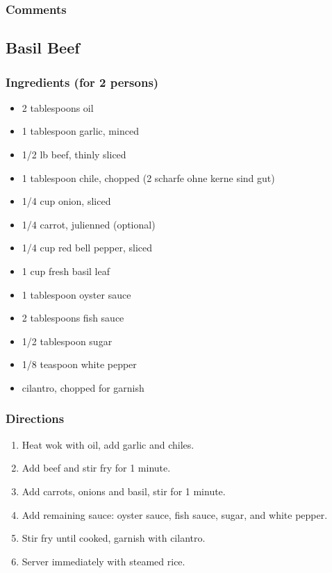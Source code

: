 \subsubsection*{Comments}

\subsection{Basil Beef}
\subsubsection*{Ingredients (for 2 persons)}
\begin{itemize}
\item[] 2 tablespoons oil
\item[] 1 tablespoon garlic, minced
\item[] 1/2 lb beef, thinly sliced
\item[] 1 tablespoon chile, chopped (2 scharfe ohne kerne sind gut)
\item[] 1/4 cup onion, sliced
\item[] 1/4 carrot, julienned (optional)
\item[] 1/4 cup red bell pepper, sliced
\item[] 1 cup fresh basil leaf
\item[] 1 tablespoon oyster sauce
\item[] 2 tablespoons fish sauce
\item[] 1/2 tablespoon sugar
\item[] 1/8 teaspoon white pepper
\item[] cilantro, chopped for garnish
\end{itemize}
\subsubsection*{Directions}
\begin{enumerate}
\item Heat wok with oil, add garlic and chiles.
\item Add beef and stir fry for 1 minute.
\item Add carrots, onions and basil, stir for 1 minute.
\item Add remaining sauce: oyster sauce, fish sauce, sugar, and white pepper.
\item Stir fry until cooked, garnish with cilantro.
\item Server immediately with steamed rice.
\end{enumerate}
\pagebreak


